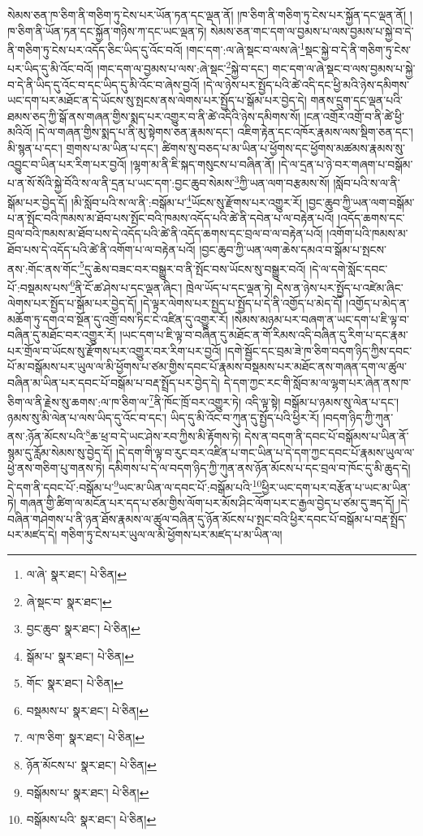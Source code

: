 སེམས་ཅན་ཁ་ཅིག་ནི་གཅིག་ཏུ་ངེས་པར་ཡོན་ཏན་དང་ལྡན་ནོ། །ཁ་ཅིག་ནི་གཅིག་ཏུ་ངེས་པར་སྐྱོན་དང་ལྡན་ནོ། །ཁ་ཅིག་ནི་ཡོན་ཏན་དང་སྐྱོན་གཉིས་ཀ་དང་ཡང་ལྡན་ཏེ། སེམས་ཅན་གང་དག་ལ་བྱམས་པ་ལས་བྱམས་པ་སྐྱེ་བ་དེ་ནི་གཅིག་ཏུ་ངེས་པར་འདོད་ཅིང་ཡིད་དུ་འོང་བའོ། །གང་དག་:ལ་ཞེ་སྡང་བ་ལས་ཞེ་\footnote{ལ་ཞེ་  སྣར་ཐང་།  པེ་ཅིན། }སྡང་སྐྱེ་བ་དེ་ནི་གཅིག་ཏུ་ངེས་པར་ཡིད་དུ་མི་འོང་བའོ། །གང་དག་ལ་བྱམས་པ་ལས་:ཞེ་སྡང་\footnote{ཞེ་སྡང་བ་  སྣར་ཐང་། }སྐྱེ་བ་དང་། གང་དག་ལ་ཞེ་སྡང་བ་ལས་བྱམས་པ་སྐྱེ་བ་དེ་ནི་ཡིད་དུ་འོང་བ་དང་ཡིད་དུ་མི་འོང་བ་ཞེས་བྱའོ། །དེ་ལ་ཉེས་པར་སྤྱོད་པའི་ཚེ་འདི་དང་ཕྱི་མའི་ཉེས་དམིགས་ཡང་དག་པར་མཐོང་ན་དེ་ཡོངས་སུ་སྤངས་ནས་ལེགས་པར་སྤྱོད་པ་སྒོམ་པར་བྱེད་དེ། གནས་དྲུག་དང་ལྡན་པའི་ཐམས་ཅད་ཀྱི་སྒོ་ནས་གཞན་གྱིས་སྨད་པར་འགྱུར་བ་ནི་ཚེ་འདིའི་ཉེས་དམིགས་སོ། །ངན་འགྲོར་འགྲོ་བ་ནི་ཚེ་ཕྱི་མའིའོ། །དེ་ལ་གཞན་གྱིས་སྨད་པ་ནི་མུ་སྟེགས་ཅན་རྣམས་དང་། འཇིག་རྟེན་དང་འཁོར་རྣམས་ལས་སྡིག་ཅན་དང་། མི་སྙན་པ་དང་། གྲགས་པ་མ་ཡིན་པ་དང་། ཚིགས་སུ་བཅད་པ་མ་ཡིན་པ་ཕྱོགས་དང་ཕྱོགས་མཚམས་རྣམས་སུ་འབྱུང་བ་ཡིན་པར་རིག་པར་བྱའོ། །ལྷག་མ་ནི་ཇི་སྐད་གསུངས་པ་བཞིན་ནོ། །དེ་ལ་དྲན་པ་ཉེ་བར་གཞག་པ་བསྒོམ་པ་ན་སོ་སོའི་སྐྱེ་བོའི་ས་ལ་ནི་དྲན་པ་ཡང་དག་:བྱང་ཆུབ་སེམས་\footnote{བྱང་ཆུབ་  སྣར་ཐང་།  པེ་ཅིན། }ཀྱི་ཡན་ལག་བརྩམས་སོ། །སློབ་པའི་ས་ལ་ནི་སྒོམ་པར་བྱེད་དོ། །མི་སློབ་པའི་ས་ལ་ནི་:བསྒོམ་པ་\footnote{སྒོམ་པ་  སྣར་ཐང་།  པེ་ཅིན། }ཡོངས་སུ་རྫོགས་པར་འགྱུར་རོ། །བྱང་ཆུབ་ཀྱི་ཡན་ལག་བསྒོམ་པ་ན་སྤོང་བའི་ཁམས་མ་ཐོབ་པས་སྤོང་བའི་ཁམས་འདོད་པའི་ཚེ་ནི་དབེན་པ་ལ་བརྟེན་པའོ། །འདོད་ཆགས་དང་བྲལ་བའི་ཁམས་མ་ཐོབ་པས་དེ་འདོད་པའི་ཚེ་ནི་འདོད་ཆགས་དང་བྲལ་བ་ལ་བརྟེན་པའོ། །འགོག་པའི་ཁམས་མ་ཐོབ་པས་དེ་འདོད་པའི་ཚེ་ནི་འགོག་པ་ལ་བརྟེན་པའོ། །བྱང་ཆུབ་ཀྱི་ཡན་ལག་ཆེས་དམའ་བ་སྒོམ་པ་སྤངས་ནས་:གོང་ནས་གོང་\footnote{གོང་  སྣར་ཐང་།  པེ་ཅིན། }དུ་ཆེས་བཟང་བར་བསྒྱུར་བ་ནི་སྤོང་བས་ཡོངས་སུ་བསྒྱུར་བའོ། །དེ་ལ་དགེ་སློང་དབང་པོ་:བསྡམས་པས་\footnote{བསྡམས་པ་  སྣར་ཐང་།  པེ་ཅིན། }ནི་ངོ་ཚ་ཤེས་པ་དང་ལྡན་ཞིང་། ཁྲེལ་ཡོད་པ་དང་ལྡན་ཏེ། དེས་ན་ཉེས་པར་སྤྱོད་པ་འཛེམ་ཞིང་ལེགས་པར་སྤྱོད་པ་སྒོམ་པར་བྱེད་དོ། །དེ་ལྟར་ལེགས་པར་སྤྱད་པ་སྤྱོད་པ་དེ་ནི་འགྱོད་པ་མེད་དོ། །འགྱོད་པ་མེད་ན་མཆོག་ཏུ་དགའ་བ་སྔོན་དུ་འགྲོ་བས་ཏིང་ངེ་འཛིན་དུ་འགྱུར་རོ། །སེམས་མཉམ་པར་བཞག་ན་ཡང་དག་པ་ཇི་ལྟ་བ་བཞིན་དུ་མཐོང་བར་འགྱུར་རོ། །ཡང་དག་པ་ཇི་ལྟ་བ་བཞིན་དུ་མཐོང་ན་གོ་རིམས་འདི་བཞིན་དུ་རིག་པ་དང་རྣམ་པར་གྲོལ་བ་ཡོངས་སུ་རྫོགས་པར་འགྱུར་བར་རིག་པར་བྱའོ། །དགེ་སྦྱོང་དང་བྲམ་ཟེ་ཁ་ཅིག་བདག་ཉིད་ཀྱིས་དབང་པོ་མ་བསྒོམས་པར་ཡུལ་ལ་མི་ཕྱོགས་པ་ཙམ་གྱིས་དབང་པོ་རྣམས་བསྡམས་པར་མཐོང་ནས་གཞན་དག་ལ་ཚུལ་བཞིན་མ་ཡིན་པར་དབང་པོ་བསྒོམ་པ་བརྡ་སྤྲོད་པར་བྱེད་དེ། དེ་དག་ཀྱང་རང་གི་སློབ་མ་ལ་ལྷག་པར་ཞེན་ནས་ཁ་ཅིག་ལ་ནི་རྗེས་སུ་ཆགས་:ལ་ཁ་ཅིག་ལ་\footnote{ལ་ཁ་ཅིག་  སྣར་ཐང་།  པེ་ཅིན། }ནི་ཁོང་ཁྲོ་བར་འགྱུར་ཏེ། འདི་ལྟ་སྟེ། བསྒོམ་པ་ཉམས་སུ་ལེན་པ་དང་། ཉམས་སུ་མི་ལེན་པ་ལས་ཡིད་དུ་འོང་བ་དང་། ཡིད་དུ་མི་འོང་བ་ཀུན་དུ་སྤྱོད་པའི་ཕྱིར་རོ། །བདག་ཉིད་ཀྱི་ཀུན་ནས་:ཉོན་མོངས་པའི་\footnote{ཉོན་མོངས་པ་  སྣར་ཐང་།  པེ་ཅིན། }ཆ་ཕྲ་བ་དེ་ཡང་ཤེས་རབ་ཀྱིས་མི་རྟོགས་ཏེ། དེས་ན་བདག་ནི་དབང་པོ་བསྒོམས་པ་ཡིན་ནོ་སྙམ་དུ་རློམ་སེམས་སུ་བྱེད་དོ། །དེ་དག་གི་ལྟ་བ་རུང་བར་འཛིན་པ་གང་ཡིན་པ་དེ་དག་ཀྱང་དབང་པོ་རྣམས་ཡུལ་ལ་ཕྱེ་ནས་གཅིག་པུ་གནས་ཏེ། དམིགས་པ་དེ་ལ་བདག་ཉིད་ཀྱི་ཀུན་ནས་ཉོན་མོངས་པ་དང་བྲལ་བ་ཁོང་དུ་མི་ཆུད་དེ། དེ་དག་ནི་དབང་པོ་:བསྒོམ་པ་\footnote{བསྒོམས་པ་  སྣར་ཐང་།  པེ་ཅིན། }ཡང་མ་ཡིན་ལ་དབང་པོ་:བསྒོམ་པའི་\footnote{བསྒོམས་པའི་  སྣར་ཐང་།  པེ་ཅིན། }ཕྱིར་ཡང་དག་པར་བརྩོན་པ་ཡང་མ་ཡིན་ཏེ། གཞན་གྱི་ཚིག་ལ་མངོན་པར་དད་པ་ཙམ་གྱིས་ལོག་པར་མོས་ཤིང་ལོག་པར་ང་རྒྱལ་བྱེད་པ་ཙམ་དུ་ཟད་དོ། །དེ་བཞིན་གཤེགས་པ་ནི་ཉན་ཐོས་རྣམས་ལ་ཚུལ་བཞིན་དུ་ཉོན་མོངས་པ་སྤང་བའི་ཕྱིར་དབང་པོ་བསྒོམ་པ་བརྡ་སྤྲོད་པར་མཛད་དེ། གཅིག་ཏུ་ངེས་པར་ཡུལ་ལ་མི་ཕྱོགས་པར་མཛད་པ་མ་ཡིན་ལ། 